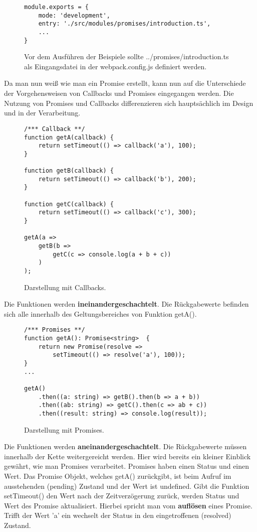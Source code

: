 \begin{figure}[H]
\begin{lstlisting}[basicstyle=\small]
module.exports = {
    mode: 'development',
    entry: './src/modules/promises/introduction.ts',
    ...
}
\end{lstlisting}
\caption{Vor dem Ausführen der Beispiele sollte ../promises/introduction.ts als Eingangsdatei in der webpack.config.js definiert werden.}
\end{figure}

\noindent
Da man nun weiß wie man ein Promise erstellt, kann nun auf die Unterschiede der Vorgehensweisen von Callbacks und Promises eingegangen werden. Die Nutzung von Promises und Callbacks differenzieren sich hauptsächlich im Design und in der Verarbeitung.

\begin{figure}[H]
\begin{lstlisting}[basicstyle=\small]
/*** Callback **/
function getA(callback) {
    return setTimeout(() => callback('a'), 100);
}

function getB(callback) {
    return setTimeout(() => callback('b'), 200);
}

function getC(callback) {
    return setTimeout(() => callback('c'), 300);
}

getA(a =>
    getB(b =>
        getC(c => console.log(a + b + c))
    )
);
\end{lstlisting}
\caption{Darstellung mit Callbacks.}
\end{figure}

\noindent
Die Funktionen werden \textbf{ineinandergeschachtelt}. Die Rückgabewerte befinden sich alle innerhalb des Geltungsbereiches von Funktion getA().

\begin{figure}[H]
\begin{lstlisting}[basicstyle=\small]
/*** Promises **/
function getA(): Promise<string>  {
    return new Promise(resolve =>
        setTimeout(() => resolve('a'), 100));
}
...

getA()
    .then((a: string) => getB().then(b => a + b))
    .then((ab: string) => getC().then(c => ab + c))
    .then((result: string) => console.log(result));
\end{lstlisting}
\caption{Darstellung mit Promises.}
\end{figure}

\noindent
Die Funktionen werden \textbf{aneinandergeschachtelt}. Die Rückgabewerte müssen innerhalb der Kette weitergereicht werden. Hier wird bereits ein kleiner Einblick gewährt, wie man Promises verarbeitet. Promises haben einen Status und einen Wert. Das Promise Objekt, welches getA() zurückgibt, ist beim Aufruf im ausstehenden (pending) Zustand und der Wert ist undefined. Gibt die Funktion setTimeout() den Wert nach der Zeitverzögerung zurück, werden Status und Wert des Promise aktualisiert. Hierbei spricht man vom \textbf{auflösen} eines Promise. Trifft der Wert 'a' ein wechselt der Status in den eingetroffenen (resolved) Zustand.

